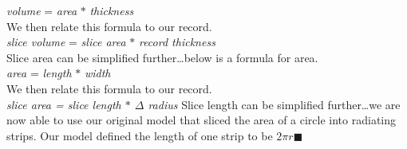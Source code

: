 \documentclass[a4paper, 11pt, oneside]{book} %
\begin{document}
\vspace{0.5\baselineskip} %
\textit{volume} = \textit{area} $*$ \textit{thickness} \\
\vspace{0.5\baselineskip} %
\vspace{0.5\baselineskip} %
We then relate this formula to our record.\\
\vspace{0.5\baselineskip} %
\vspace{0.5\baselineskip} %
\textit{slice volume} = \textit{slice area} $*$ \textit{record thickness}\\
\vspace{0.5\baselineskip} %
\vspace{0.5\baselineskip} %
Slice area can be simplified further\dots below is a formula for area.\\
\vspace{0.5\baselineskip} %
\vspace{0.5\baselineskip} %
\textit{area} = \textit{length} $*$ \textit{width}\\
\vspace{0.5\baselineskip} %
\vspace{0.5\baselineskip} %
We then relate this formula to our record.\\
\vspace{0.5\baselineskip} %
\vspace{0.5\baselineskip} %
\textit{slice area = slice length $*$ $\Delta$ radius}
\vspace{0.5\baselineskip} %
\vspace{0.5\baselineskip} %
Slice length can be simplified further\dots we are now able to use our original model that sliced the area of a circle into radiating strips. Our model defined the length of one strip to be 
\vspace{0.5\baselineskip} %
\vspace{0.5\baselineskip} %
$2\pi r \blacksquare$ \\
\vspace{0.5\baselineskip} %
\vspace{0.5\baselineskip} %
\end{document}
